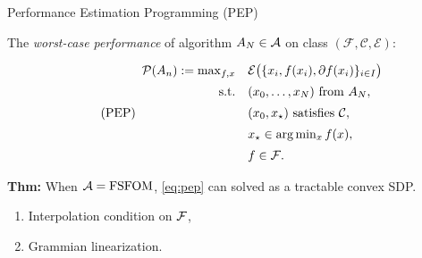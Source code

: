 \documentclass[9pt]{beamer}
\begin{document}
\begin{frame}{Performance Estimation Programming (PEP)}

  The \emph{worst-case performance} of algorithm $A_N \in \mathcal A$ on class $(\mathcal{F},\mathcal{C},\mathcal{E})$:

  \vfill

  \begin{tcolorbox}[colback=black!8, colframe=black!8, boxrule=0pt,
    arc=2pt, left=4pt, right=4pt, top=2pt, bottom=2pt]
    \begin{equation}
      \label{eq:pep}
      \tag{PEP}
      \begin{array}{rl}
        \mathcal P(A_n) := \max_{f, x} &  \mathcal{E}\bigl(\{x_i, f(x_i), \partial f(x_i)\}_{i\in I}\bigr)\\[0.5em]
        \mathrm{s.t.}  & (x_0, \dots, x_N) \text{ from } A_N,\\[0.5em]
                                     & (x_0,x_\star) \text{ satisfies } \mathcal C,\\[0.5em]
                                     &x_\star \in \arg\min_x f(x),\\[0.5em]
                                     & f\in \mathcal F.
      \end{array}    
    \end{equation}
  \end{tcolorbox}

  \vfill

  \textbf{Thm:} When $\mathcal A={\text{FSFOM}}$, \eqref{eq:pep} can solved as a tractable convex SDP.
  \begin{enumerate}
  \item Interpolation condition on $\mathcal F$,
  \item Grammian linearization.
  \end{enumerate}
  

\end{frame}
\end{document}
